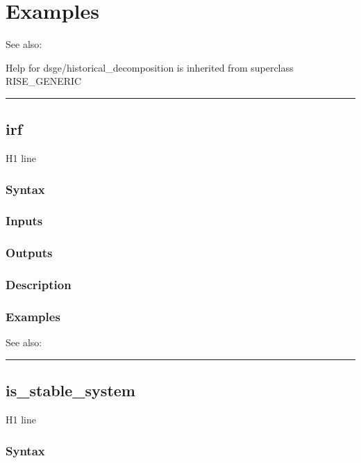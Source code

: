 \documentclass[letterpaper,10pt,english]{sphinxmanual}
\begin{document}
\section{Examples}
\label{classes/models/@dsge/dsge:id59}
See also:

Help for dsge/historical\_decomposition is inherited from superclass RISE\_GENERIC


\bigskip\hrule{}\bigskip



\subsection{irf}
\label{classes/models/@dsge/dsge:id60}\label{classes/models/@dsge/dsge:irf}
H1 line


\subsubsection{Syntax}
\label{classes/models/@dsge/dsge:id61}

\subsubsection{Inputs}
\label{classes/models/@dsge/dsge:id62}

\subsubsection{Outputs}
\label{classes/models/@dsge/dsge:id63}

\subsubsection{Description}
\label{classes/models/@dsge/dsge:id64}

\subsubsection{Examples}
\label{classes/models/@dsge/dsge:id65}
See also:


\bigskip\hrule{}\bigskip



\subsection{is\_stable\_system}
\label{classes/models/@dsge/dsge:is-stable-system}\label{classes/models/@dsge/dsge:id66}
H1 line


\subsubsection{Syntax}
\label{classes/models/@dsge/dsge:id67}
\end{document}
